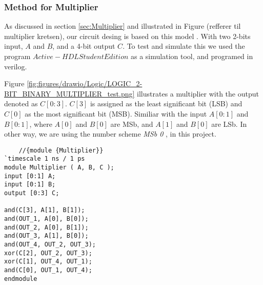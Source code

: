 \subsubsection{Method for Multiplier} \label{Method-Multiplier}
As discussed in section \ref{sec:Multiplier} and illustrated in Figure (refferer til multiplier kretsen), our circuit desing is based on this model . With two 2-bits input, $A$ and $B$, and a 4-bit output $C$. To test and simulate this we used the program $Active-HDL Student Edition$ as a simulation tool, and programed in verilog. 



Figure \ref{fig:figures/drawio/Logic/LOGIC_2-BIT_BINARY_MULTIPLIER_test.png} illustrates a multiplier with the output denoted as $C[0:3]$. $C[3]$ is assigned as the least significant bit (LSB) and $C[0]$ as the most significant bit (MSB). Similiar with the input $A[0:1]$ and $B[0:1]$, where $A[0] $ and $B[0]$ are MSb, and $A[1]$ and $B[0]$ are LSb. In other way, we are using the number scheme \emph{MSb 0} \cite{wikipediacontributors_2023_bit}, in this project.

\begin{lstlisting}
    //{module {Multiplier}}	
`timescale 1 ns / 1 ps
module Multiplier ( A, B, C );
input [0:1] A;
input [0:1] B;
output [0:3] C;

and(C[3], A[1], B[1]);
and(OUT_1, A[0], B[0]);
and(OUT_2, A[0], B[1]);
and(OUT_3, A[1], B[0]);
and(OUT_4, OUT_2, OUT_3);
xor(C[2], OUT_2, OUT_3); 
xor(C[1], OUT_4, OUT_1);
and(C[0], OUT_1, OUT_4);
endmodule
\end{lstlisting}
